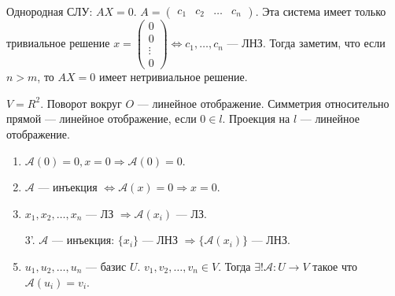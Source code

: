 Однородная СЛУ: $AX = 0$.  $A = \begin{pmatrix} c_1 & c_2 & \ldots & c_n \end{pmatrix}$. Эта система имеет только  тривиальное решение $x = \begin{pmatrix} 0 \\ 0 \\ \vdots \\ 0\end{pmatrix} \iff c_1, \ldots, c_n$ --- ЛНЗ. Тогда заметим, что если $n > m$, то  $AX=0$ имеет нетривиальное решение.
\begin{example}
   $V=R^2$. Поворот вокруг $O$ --- линейное отображение. Симметрия относительно прямой --- линейное отображение, если  $0 \in l$. Проекция на  $l$ --- линейное отображение.
\end{example}
\begin{properties}
    \begin{enumerate}
        \item $\mathcal{A}(0) = 0, x = 0 \Rightarrow \mathcal{A}(0) = 0$.
        \item $\mathcal{A}$ --- инъекция  $\iff \mathcal{A}(x) = 0 \Rightarrow x = 0$.
        \item $x_1, x_2, \ldots, x_n$ --- ЛЗ $\Rightarrow \mathcal{A}(x_i)$ --- ЛЗ.
        \item[3'.] $\mathcal{A}$ --- инъекция:  $\{x_i \}$ --- ЛНЗ  $\Rightarrow \{\mathcal{A}(x_i)\}$ --- ЛНЗ.
        \item  $u_1, u_2, \ldots, u_n$ --- базис $U$.  $v_1, v_2, \ldots, v_n \in V$. Тогда $\exists! \mathcal{A}\!: U \to V$ такое что  $\mathcal{A}(u_i) = v_i$.
    \end{enumerate}
\end{properties}
